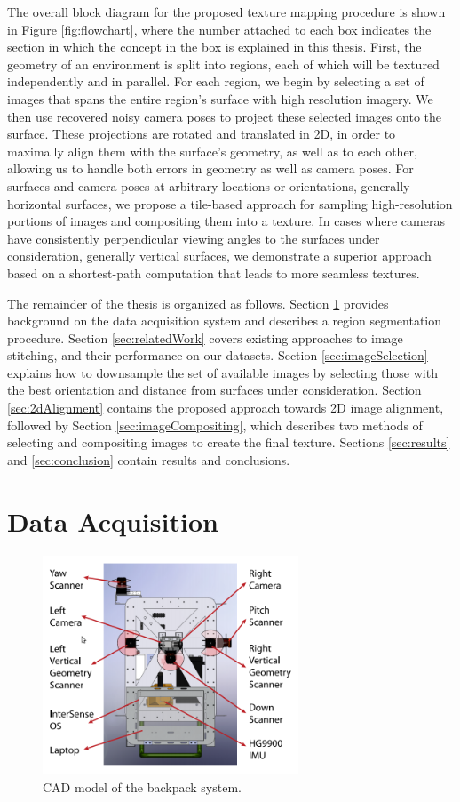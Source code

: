 \documentclass[]{spie}  %
\begin{document}
The overall block diagram for the proposed texture mapping procedure
is shown in Figure \ref{fig:flowchart}, where the number attached to
each box indicates the section in which the concept in the box is
explained in this thesis. First, the geometry of an environment is
split into regions, each of which will be textured independently and
in parallel. For each region, we begin by selecting a set of images
that spans the entire region's surface with high resolution
imagery. We then use recovered noisy camera poses to project these
selected images onto the surface. These projections are rotated and
translated in 2D, in order to maximally align them with the surface's
geometry, as well as to each other, allowing us to handle both errors
in geometry as well as camera poses. For surfaces and camera poses at
arbitrary locations or orientations, generally horizontal surfaces, we
propose a tile-based approach for sampling high-resolution portions of
images and compositing them into a texture. In cases where cameras
have consistently perpendicular viewing angles to the surfaces under
consideration, generally vertical surfaces, we demonstrate a superior
approach based on a shortest-path computation that leads to more
seamless textures.

The remainder of the thesis is organized as follows. Section
\ref{sec:dataAcquisition} provides background on the data acquisition
system and describes a region segmentation procedure. Section
\ref{sec:relatedWork} covers existing approaches to image stitching,
and their performance on our datasets. Section
\ref{sec:imageSelection} explains how to downsample the set of
available images by selecting those with the best orientation and
distance from surfaces under consideration. Section
\ref{sec:2dAlignment} contains the proposed approach towards 2D image
alignment, followed by Section \ref{sec:imageCompositing}, which
describes two methods of selecting and compositing images to create
the final texture. Sections \ref{sec:results} and \ref{sec:conclusion}
contain results and conclusions.

\section{Data Acquisition}
\label{sec:dataAcquisition}

\begin{figure}
  \centering
  \includegraphics[width=3in]{backpackCAD.png}
  \caption{CAD model of the backpack system.}
  \label{fig:backpack}
\end{figure}
\end{document}
